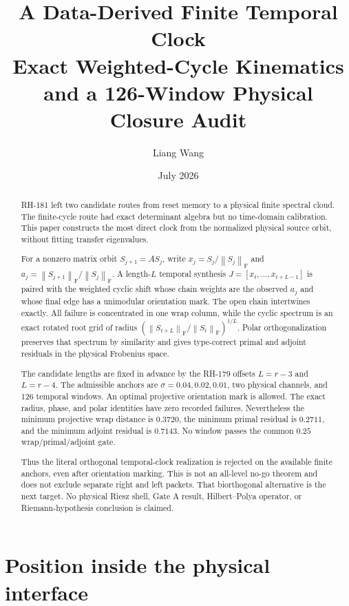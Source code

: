 \documentclass[12pt]{article}
\title{A Data-Derived Finite Temporal Clock\\
\large Exact Weighted-Cycle Kinematics and a 126-Window Physical Closure Audit}
\author{Liang Wang}
\date{July 2026}
\theoremstyle{remark}
\newcommand{\norm}[1]{\left\lVert#1\right\rVert}
\newcommand{\F}{\mathrm F}
\begin{document}
\maketitle

\begin{abstract}
RH-181 left two candidate routes from reset memory to a physical finite
spectral cloud.  The finite-cycle route had exact determinant algebra but no
time-domain calibration.  This paper constructs the most direct clock from
the normalized physical source orbit, without fitting transfer eigenvalues.

For a nonzero matrix orbit $S_{j+1}=AS_j$, write
$x_j=S_j/\norm{S_j}_{\F}$ and
$a_j=\norm{S_{j+1}}_{\F}/\norm{S_j}_{\F}$.  A length-$L$ temporal synthesis
$J=[x_t,\ldots,x_{t+L-1}]$ is paired with the weighted cyclic shift whose
chain weights are the observed $a_j$ and whose final edge has a unimodular
orientation mark.  The open chain intertwines exactly.  All failure is
concentrated in one wrap column, while the cyclic spectrum is an exact
rotated root grid of radius
$(\norm{S_{t+L}}_{\F}/\norm{S_t}_{\F})^{1/L}$.  Polar orthogonalization
preserves that spectrum by similarity and gives type-correct primal and
adjoint residuals in the physical Frobenius space.

The candidate lengths are fixed in advance by the RH-179 offsets
$L=r-3$ and $L=r-4$.  The admissible anchors are
$\sigma=0.04,0.02,0.01$, two physical channels, and 126 temporal windows.
An optimal projective orientation mark is allowed.  The exact radius, phase,
and polar identities have zero recorded failures.  Nevertheless the minimum
projective wrap distance is $0.3720$, the minimum primal residual is
$0.2711$, and the minimum adjoint residual is $0.7143$.  No window passes the
common $0.25$ wrap/primal/adjoint gate.

Thus the literal orthogonal temporal-clock realization is rejected on the
available finite anchors, even after orientation marking.  This is not an
all-level no-go theorem and does not exclude separate right and left packets.
That biorthogonal alternative is the next target.  No physical Riesz shell,
Gate A result, Hilbert--Polya operator, or Riemann-hypothesis conclusion is
claimed.
\end{abstract}

\section{Position inside the physical interface}
\end{document}

